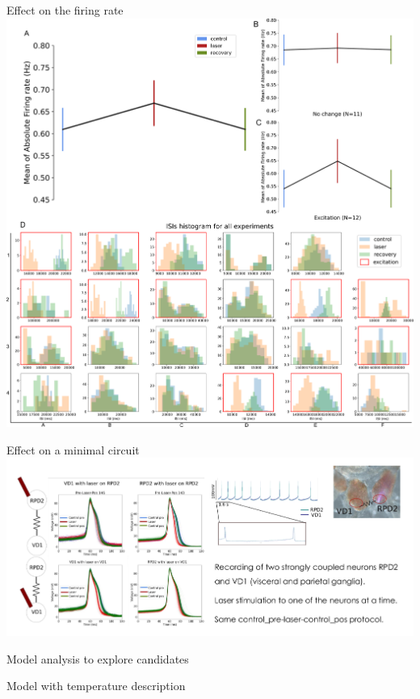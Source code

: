 \documentclass[aspectratio=43]{beamer}
\begin{document}
\begin{frame}{Effect on the firing rate}
	\includegraphics[width=\textwidth]{laser/frequency.pdf}
\end{frame}


\begin{frame}{Effect on a minimal circuit}
	\includegraphics[width=\textwidth]{Images/electrical.png}
\end{frame}


\begin{frame}{Model analysis to explore candidates}
\end{frame}

\begin{frame}{Model with temperature description}
\end{frame}
\end{document}
